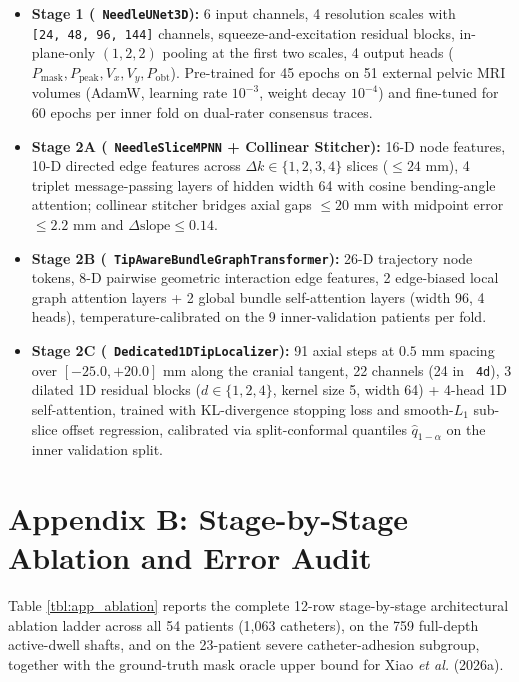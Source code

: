 \documentclass[
  11pt,
]{article}
\providecommand{\tightlist}{%
  \setlength{\itemsep}{0pt}\setlength{\parskip}{0pt}}
\let\nforigtexttt\texttt
\renewcommand{\texttt}[1]{\nforigtexttt{\XeTeXinterchartokenstate=1 #1}}
\begin{document}
\begin{itemize}
\tightlist
\item
  \textbf{Stage 1 (\texttt{NeedleUNet3D}):} 6 input channels, 4
  resolution scales with \texttt{{[}24,\ 48,\ 96,\ 144{]}} channels,
  squeeze-and-excitation residual blocks, in-plane-only \((1, 2, 2)\)
  pooling at the first two scales, 4 output heads
  (\(P_{\text{mask}}, P_{\text{peak}}, V_x, V_y, P_{\text{obt}}\)).
  Pre-trained for 45 epochs on 51 external pelvic MRI volumes (AdamW,
  learning rate \(10^{-3}\), weight decay \(10^{-4}\)) and fine-tuned
  for 60 epochs per inner fold on dual-rater consensus traces.
\item
  \textbf{Stage 2A (\texttt{NeedleSliceMPNN} + Collinear Stitcher):}
  16-D node features, 10-D directed edge features across
  \(\Delta k \in \{1, 2, 3, 4\}\) slices (\(\le 24\text{ mm}\)), 4
  triplet message-passing layers of hidden width 64 with cosine
  bending-angle attention; collinear stitcher bridges axial gaps
  \(\le 20\text{ mm}\) with midpoint error \(\le 2.2\text{ mm}\) and
  \(\Delta\text{slope} \le 0.14\).
\item
  \textbf{Stage 2B (\texttt{TipAwareBundleGraphTransformer}):} 26-D
  trajectory node tokens, 8-D pairwise geometric interaction edge
  features, 2 edge-biased local graph attention layers + 2 global bundle
  self-attention layers (width 96, 4 heads), temperature-calibrated on
  the 9 inner-validation patients per fold.
\item
  \textbf{Stage 2C (\texttt{Dedicated1DTipLocalizer}):} 91 axial steps
  at \(0.5\text{ mm}\) spacing over \([-25.0, +20.0]\text{ mm}\) along
  the cranial tangent, 22 channels (24 in \texttt{4d}), 3 dilated 1D
  residual blocks (\(d \in \{1, 2, 4\}\), kernel size 5, width 64) +
  4-head 1D self-attention, trained with KL-divergence stopping loss and
  smooth-\(L_1\) sub-slice offset regression, calibrated via
  split-conformal quantiles \(\hat{q}_{1-\alpha}\) on the inner
  validation split.
\end{itemize}

\section{Appendix B: Stage-by-Stage Ablation and Error
Audit}\label{appendix-b-stage-by-stage-ablation-and-error-audit}

Table \ref{tbl:app_ablation} reports the complete 12-row stage-by-stage
architectural ablation ladder across all 54 patients (1,063 catheters),
on the 759 full-depth active-dwell shafts, and on the 23-patient severe
catheter-adhesion subgroup, together with the ground-truth mask oracle
upper bound for Xiao \emph{et al.} (2026a).
\end{document}
